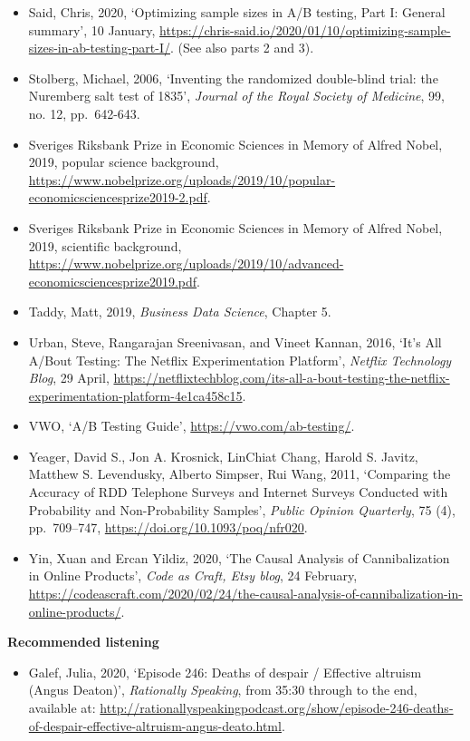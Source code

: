 \documentclass[
]{book}
\providecommand{\tightlist}{%
  \setlength{\itemsep}{0pt}\setlength{\parskip}{0pt}}
\begin{document}
\begin{itemize}
\item
  Said, Chris, 2020, `Optimizing sample sizes in A/B testing, Part I: General summary', 10 January, \url{https://chris-said.io/2020/01/10/optimizing-sample-sizes-in-ab-testing-part-I/}. (See also parts 2 and 3).
\item
  Stolberg, Michael, 2006, `Inventing the randomized double-blind trial: the Nuremberg salt test of 1835', \emph{Journal of the Royal Society of Medicine}, 99, no. 12, pp.~642-643.
\item
  Sveriges Riksbank Prize in Economic Sciences in Memory of Alfred Nobel, 2019, popular science background, \url{https://www.nobelprize.org/uploads/2019/10/popular-economicsciencesprize2019-2.pdf}.
\item
  Sveriges Riksbank Prize in Economic Sciences in Memory of Alfred Nobel, 2019, scientific background, \url{https://www.nobelprize.org/uploads/2019/10/advanced-economicsciencesprize2019.pdf}.
\item
  Taddy, Matt, 2019, \emph{Business Data Science}, Chapter 5.
\item
  Urban, Steve, Rangarajan Sreenivasan, and Vineet Kannan, 2016, `It's All A/Bout Testing: The Netflix Experimentation Platform', \emph{Netflix Technology Blog}, 29 April, \url{https://netflixtechblog.com/its-all-a-bout-testing-the-netflix-experimentation-platform-4e1ca458c15}.
\item
  VWO, `A/B Testing Guide', \url{https://vwo.com/ab-testing/}.
\item
  Yeager, David S., Jon A. Krosnick, LinChiat Chang, Harold S. Javitz, Matthew S. Levendusky, Alberto Simpser, Rui Wang, 2011, `Comparing the Accuracy of RDD Telephone Surveys and Internet Surveys Conducted with Probability and Non-Probability Samples', \emph{Public Opinion Quarterly}, 75 (4), pp.~709--747, \url{https://doi.org/10.1093/poq/nfr020}.
\item
  Yin, Xuan and Ercan Yildiz, 2020, `The Causal Analysis of Cannibalization in Online Products', \emph{Code as Craft, Etsy blog}, 24 February, \url{https://codeascraft.com/2020/02/24/the-causal-analysis-of-cannibalization-in-online-products/}.
\end{itemize}

\textbf{Recommended listening}

\begin{itemize}
\tightlist
\item
  Galef, Julia, 2020, `Episode 246: Deaths of despair / Effective altruism (Angus Deaton)', \emph{Rationally Speaking}, from 35:30 through to the end, available at: \url{http://rationallyspeakingpodcast.org/show/episode-246-deaths-of-despair-effective-altruism-angus-deato.html}.
\end{itemize}
\end{document}
